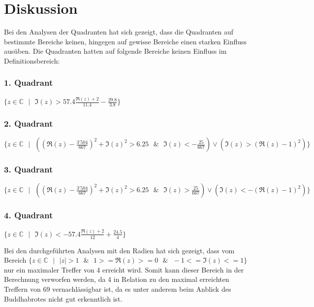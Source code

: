 \section{Diskussion}
Bei den Analysen der Quadranten hat sich gezeigt, dass die Quadranten auf bestimmte Bereiche keinen, hingegen auf gewisse Bereiche einen starken Einfluss ausüben. Die Quadranten hatten auf folgende Bereiche keinen Einfluss im Definitionsbereich:
\begin{center}
\subsubsection*{1. Quadrant}
$\{z \in \mathbb{C}\text{ }|\text{ }\Im(z)>57.4\frac{\Re(z)+2}{11.4}-\frac{29.8}{3.8}\}$
\subsubsection*{2. Quadrant}
$\{z \in \mathbb{C}\text{ }|\text{ }((\Re(z)-\frac{3'504}{667})^2+\Im(z)^2>6.25 \text{ }\&\text{ } \Im(z) < -\frac{25}{667}) \lor (\Im(z)>(\Re(z)-1)^2) \}$
\subsubsection*{3. Quadrant}
$\{z \in \mathbb{C}\text{ }|\text{ }((\Re(z)-\frac{3'504}{667})^2+\Im(z)^2>6.25 \text{ }\&\text{ } \Im(z) > \frac{25}{667}) \lor (\Im(z)<-(\Re(z)-1)^2) \}$
\subsubsection*{4. Quadrant}
$\{z \in \mathbb{C}\text{ }|\text{ }\Im(z)<-57.4\frac{\Re(z)+2}{12}+\frac{24.5}{4}\}$\\
\end{center}
Bei den durchgeführten Analysen mit den Radien hat sich gezeigt, dass vom Bereich $\{z \in \mathbb{C}\text{ }|\text{ } |z| >1\text{ } \& \text{ } 1>=\Re(z)>=0 \text{ } \& \text{ }-1<=\Im(z)<=1\}$ nur ein maximaler Treffer von 4 erreicht wird. Somit kann dieser Bereich in der Berechnung verworfen werden, da 4 in Relation zu den maximal erreichten Treffern von 69 vernachlässigbar ist, da es unter anderem beim Anblick des Buddhabrotes nicht gut erkenntlich ist.